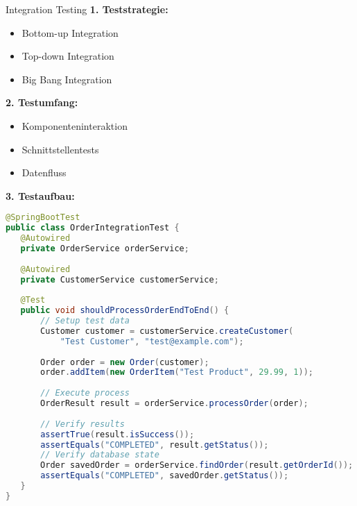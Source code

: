 \begin{KR}{Integration Testing}
\textbf{1. Teststrategie:}
\begin{itemize}
   \item Bottom-up Integration
   \item Top-down Integration
   \item Big Bang Integration
\end{itemize}

\textbf{2. Testumfang:}
\begin{itemize}
   \item Komponenteninteraktion
   \item Schnittstellentests
   \item Datenfluss
\end{itemize}

\textbf{3. Testaufbau:}
\begin{lstlisting}[language=Java, style=basesmol]
@SpringBootTest
public class OrderIntegrationTest {
   @Autowired
   private OrderService orderService;
   
   @Autowired
   private CustomerService customerService;
   
   @Test
   public void shouldProcessOrderEndToEnd() {
       // Setup test data
       Customer customer = customerService.createCustomer(
           "Test Customer", "test@example.com");
       
       Order order = new Order(customer);
       order.addItem(new OrderItem("Test Product", 29.99, 1));
       
       // Execute process
       OrderResult result = orderService.processOrder(order);
       
       // Verify results
       assertTrue(result.isSuccess());
       assertEquals("COMPLETED", result.getStatus());
       // Verify database state
       Order savedOrder = orderService.findOrder(result.getOrderId());
       assertEquals("COMPLETED", savedOrder.getStatus());
   }
}
\end{lstlisting}
\end{KR}

